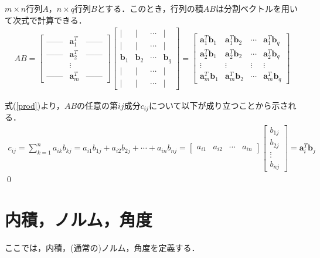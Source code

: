 \begin{theo}
$m\times n$行列$A$，$n\times q$行列$B$とする．このとき，行列の積$AB$は分割ベクトルを用いて次式で計算できる．
\begin{align}
AB=
\begin{bmatrix}
\mbox{------} & {\bm a}_1^T & \mbox{------} \\
\mbox{------} & {\bm a}_2^T & \mbox{------} \\
 & \vdots & \\
\mbox{------} & {\bm a}_m^T & \mbox{------}
\end{bmatrix}
\begin{bmatrix}
| & | & \cdots & | \\[-2pt]
| & | & \cdots & | \\
{\bm b}_1 & {\bm b}_2 & \cdots & {\bm b}_q \\
| & | & \cdots & |	\\[-2pt]
| & | & \cdots & |
\end{bmatrix}
=
\begin{bmatrix}
{\bm a}_1^T {\bm b}_1 & {\bm a}_1^T {\bm b}_2 & \cdots & {\bm a}_1^T {\bm b}_q \\
{\bm a}_2^T {\bm b}_1 & {\bm a}_2^T {\bm b}_2 & \cdots & {\bm a}_2^T {\bm b}_q \\
\vdots & \vdots & \vdots & \vdots \\
{\bm a}_m^T {\bm b}_1 & {\bm a}_m^T {\bm b}_2 & \cdots & {\bm a}_m^T {\bm b}_q 
\end{bmatrix}
\end{align}
\end{theo}
\begin{pro}
式(\ref{prod})より，$AB$の任意の第$ij$成分$c_{ij}$について以下が成り立つことから示される．
\begin{align*}
c_{ij} = \sum_{k=1}^n a_{ik}b_{kj}=a_{i1}b_{1j}+a_{i2}b_{2j}+\cdots+a_{in}b_{nj}=
\begin{bmatrix}
a_{i1} & a_{i2} & \cdots & a_{in}
\end{bmatrix}
\begin{bmatrix}
b_{1j} \\
b_{2j} \\
\vdots \\
b_{nj}
\end{bmatrix}
={\bm a}_i^T {\bm b}_j
\end{align*}
\qed	
\end{pro}

\section{内積，ノルム，角度}
ここでは，内積，(通常の)ノルム，角度を定義する．

